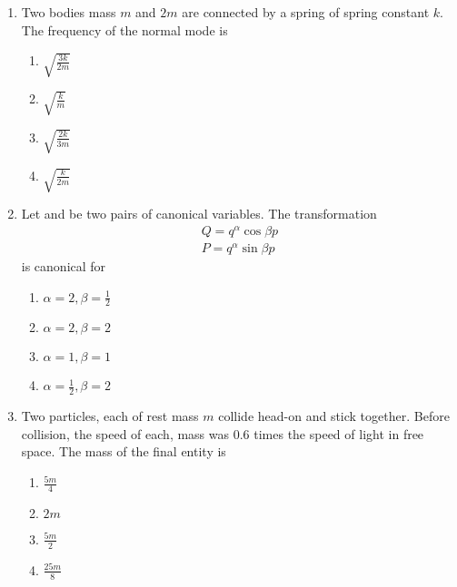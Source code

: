 \documentclass[journal]{IEEEtran}
\begin{document}
\begin{enumerate}
\begin{multicols}{4}
\begin{enumerate}
        \item $\frac{2\brak{1-\dot{q}}}{q^3}$
        \item $\frac{2}{q^3}$
        \item $\frac{\dot{q}}{q^3}$
    \end{enumerate}
\end{multicols}
\item Two bodies mass $m$ and $2m$ are connected by a spring of spring constant $k$. The frequency of the normal mode is
\begin{multicols}{4}
    \begin{enumerate}
        \item $\sqrt{\frac{3k}{2m}}$
        \item $\sqrt{\frac{k}{m}}$
        \item $\sqrt{\frac{2k}{3m}}$
        \item $\sqrt{\frac{k}{2m}}$
    \end{enumerate}
\end{multicols}
\item Let  and  be two pairs of canonical variables. The transformation
\begin{align*}
    Q=q^{\alpha}\cos{\beta p}\\
    P=q^{\alpha}\sin{\beta p} 
\end{align*}
is canonical for
\begin{multicols}{4}
    \begin{enumerate}
        \item $\alpha =2, \beta =\frac{1}{2}$
        \item $\alpha =2, \beta =2$
        \item $\alpha =1, \beta =1$
        \item $\alpha =\frac{1}{2}, \beta =2$
    \end{enumerate}
\end{multicols}
\item Two particles, each of rest mass $m$ collide head-on and stick together. Before collision, the speed of each, mass was 0.6 times the speed of light in free space. The mass of the final entity is
\begin{multicols}{4}
    \begin{enumerate}
        \item $\frac{5m}{4}$
        \item $2m$
        \item $\frac{5m}{2}$
        \item $\frac{25m}{8}$

\end{enumerate}
\end{multicols}
\end{enumerate}
\end{document}
